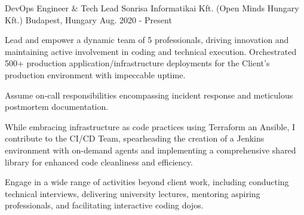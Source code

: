 

\begin{cventries}

  \cventry
    {DevOps Engineer \& Tech Lead} %
    {Sonrisa Informatikai Kft. (Open Minds Hungary Kft.)} %
    {Budapest, Hungary} %
    {Aug. 2020 - Present} %
    {
      \begin{cvitems} %
        \item {Lead and empower a dynamic team of 5 professionals, driving innovation and maintaining active involvement in coding and technical execution. Orchestrated 500+ production application/infrastructure deployments for the Client's production environment with impeccable uptime.}
        \item {Assume on-call responsibilities encompassing incident response and meticulous postmortem documentation.}
        \item {While embracing infrastructure as code practices using Terraform an Ansible, I contribute to the CI/CD Team, spearheading the creation of a Jenkins environment with on-demand agents and implementing a comprehensive shared library for enhanced code cleanliness and efficiency.}
        \item {Engage in a wide range of activities beyond client work, including conducting technical interviews, delivering university lectures, mentoring aspiring professionals, and facilitating interactive coding dojos.}
      \end{cvitems}
    }


\end{cventries}
